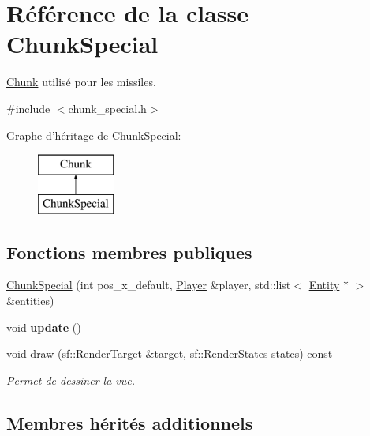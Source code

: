 \hypertarget{class_chunk_special}{\section{Référence de la classe Chunk\+Special}
\label{class_chunk_special}
}


\hyperlink{class_chunk}{Chunk} utilisé pour les missiles.  




{\ttfamily \#include $<$chunk\+\_\+special.\+h$>$}

Graphe d'héritage de Chunk\+Special\+:\begin{figure}[H]
\begin{center}
\leavevmode
\includegraphics[height=2.000000cm]{class_chunk_special}
\end{center}
\end{figure}
\subsection*{Fonctions membres publiques}
\begin{DoxyCompactItemize}
\item 
\hyperlink{class_chunk_special_a0b705f7d5d8efebe85a383be5f8f1a04}{Chunk\+Special} (int pos\+\_\+x\+\_\+default, \hyperlink{class_player}{Player} \&player, std\+::list$<$ \hyperlink{class_entity}{Entity} $\ast$ $>$ \&entities)
\item 
\hypertarget{class_chunk_special_a1c592c10ad36e6b6c3f2dff6971f38e2}{void {\bfseries update} ()}\label{class_chunk_special_a1c592c10ad36e6b6c3f2dff6971f38e2}

\item 
\hypertarget{class_chunk_special_a72eea04d7626ebdac933421da013769a}{void \hyperlink{class_chunk_special_a72eea04d7626ebdac933421da013769a}{draw} (sf\+::\+Render\+Target \&target, sf\+::\+Render\+States states) const }\label{class_chunk_special_a72eea04d7626ebdac933421da013769a}

\begin{DoxyCompactList}\small\item\em Permet de dessiner la vue. \end{DoxyCompactList}\end{DoxyCompactItemize}
\subsection*{Membres hérités additionnels}


